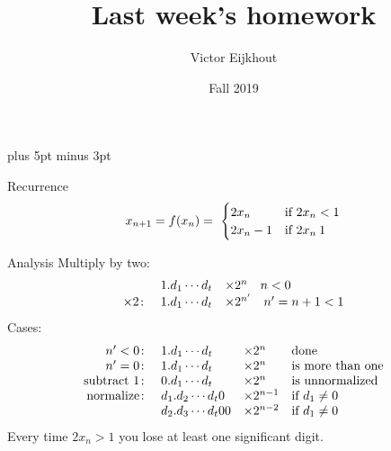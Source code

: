 \documentclass[11pt]{beamer}
\def\hpcsemester{Fall 2019}
\def\hpcteachers{Victor Eijkhout}
\begin{document}
\parskip=10pt plus 5pt minus 3pt

\title{Last week's homework}
\author{\hpcteachers}
\date{\hpcsemester}

\begin{frame}{Recurrence}
  \[ x_{n+1}=f(x_n) = \
  \begin{cases}
    2x_n&\hbox{if $2x_n<1$}\\
    2x_n-1&\hbox{if $2x_n\>1$}\\
  \end{cases}
  \]
\end{frame}

\begin{frame}{Analysis}
  Multiply by two:
  \[ 
  \begin{array}{rll}
    &1.d_1\cdots d_t&\times 2^n\quad\hbox{$n<0$}\\
    \times 2\colon&1.d_1\cdots d_t&\times 2^{n'}\quad\hbox{$n'=n+1<1$}\\
  \end{array}
  \]
  Cases:
  \[ 
  \begin{array}{rlll}
    n'<0\colon&             1.d_1\cdots d_t&    \times 2^n&    \hbox{done}\\
    n'=0\colon&             1.d_1\cdots d_t&    \times 2^n&    \hbox{is more than one}\\
    \hbox{subtract~1}\colon&0.d_1\cdots d_t&    \times 2^n&    \hbox{is unnormalized}\\
    \hbox{normalize}\colon& d_1.d_2\cdots d_t0& \times 2^{n-1}&\hbox{if $d_1\not=0$}\\
    &                       d_2.d_3\cdots d_t00&\times 2^{n-2}&\hbox{if $d_1\not=0$}\\
  \end{array}
  \]
  Every time $2x_n>1$ you lose at least one significant digit.
\end{frame}
\end{document}
